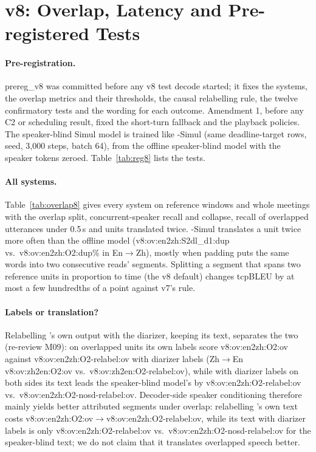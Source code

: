 \section{v8: Overlap, Latency and Pre-registered Tests}
\label{app:v8}



\paragraph{Pre-registration.} prereg\_v8 was committed before any v8 test decode started; it fixes the systems, the
overlap metrics and their thresholds, the causal relabelling rule, the twelve confirmatory tests and the wording for
each outcome. Amendment 1, before any C2 or scheduling result, fixed the short-turn fallback and the playback policies.
The speaker-blind Simul model is trained like \sys{}-Simul (same deadline-target rows, seed, 3{,}000 steps, batch 64),
from the offline speaker-blind model with the speaker tokens zeroed. Table~\ref{tab:reg8} lists the tests.



\paragraph{All systems.} Table~\ref{tab:overlap8} gives every system on reference windows and whole meetings with the
overlap split, concurrent-speaker recall and collapse, recall of overlapped utterances under 0.5\,s and units translated
twice. \sys{}-Simul translates a unit twice more often than the offline model (\num{v8:ov:en2zh:S2dl_d1:dup} vs.\
\num{v8:ov:en2zh:O2:dup}\% in En$\rightarrow$Zh), mostly when padding puts the same words into two consecutive reads'
segments. Splitting a segment that spans two reference units in proportion to time (the v8 default) changes tcpBLEU by
at most a few hundredths of a point against v7's rule.




\paragraph{Labels or translation?} Relabelling \sys{}'s own output with the diarizer, keeping its text, separates the
two (re-review M09): on overlapped units its own labels score \num{v8:ov:en2zh:O2:ov} against
\num{v8:ov:en2zh:O2-relabel:ov} with diarizer labels (Zh$\rightarrow$En \num{v8:ov:zh2en:O2:ov} vs.\
\num{v8:ov:zh2en:O2-relabel:ov}), while with diarizer labels on both sides its text leads the speaker-blind model's by
\num{v8:ov:en2zh:O2-relabel:ov} vs.\ \num{v8:ov:en2zh:O2-nosd-relabel:ov}. Decoder-side speaker conditioning therefore mainly yields better
attributed segments under overlap: relabelling \sys{}'s own text costs \num{v8:ov:en2zh:O2:ov}$\rightarrow$\num{v8:ov:en2zh:O2-relabel:ov},
while its text with diarizer labels is only \num{v8:ov:en2zh:O2-relabel:ov} vs.\ \num{v8:ov:en2zh:O2-nosd-relabel:ov} for the
speaker-blind text; we do not claim that it translates overlapped speech better.

